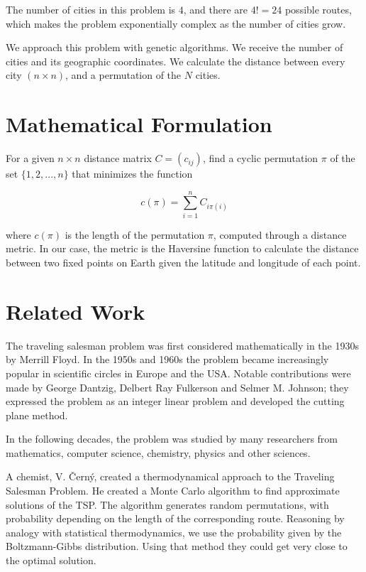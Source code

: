 \documentclass[twoside,twocolumn]{article}
\begin{document}
  The number of cities in this problem is $4$, and there are $4! = 24$ possible routes, which makes the problem exponentially complex as the number of cities grow.\linebreak
  
  We approach this problem with genetic algorithms. We receive the number of cities and its geographic coordinates. We calculate the distance between every city $(n \times n)$, and a permutation of the $N$ cities.\linebreak
  
  
  \section{Mathematical Formulation}
  
  For a given $n \times n$ distance matrix $C = (c_{ij})$, find a cyclic permutation $\pi$ of the set $\{1, 2, ..., n\}$ that minimizes the function
  
  \begin{equation}
  c(\pi) = \sum_{i=1}^{n} C_{i\pi(i)}
  \end{equation}
  
  where $c(\pi)$ is the length of the permutation $\pi$, computed through a distance metric. In our case, the metric is the Haversine function to calculate the distance between two fixed points on Earth given the latitude and longitude of each point.
  
  \section{Related Work}
  
  The traveling salesman problem was first considered mathematically in the 1930s by Merrill Floyd. In the 1950s and 1960s the problem became increasingly popular in scientific circles in Europe and the USA. Notable contributions were made by George Dantzig, Delbert Ray Fulkerson and Selmer M. Johnson; they expressed the problem as an integer linear problem and developed the cutting plane method.\linebreak
  
  In the following decades, the problem was studied by many researchers from mathematics, computer science, chemistry, physics and other sciences.\linebreak
  
  A chemist, V. Černý, created a thermodynamical approach to the Traveling Salesman Problem. He created a Monte Carlo algorithm to find approximate solutions of the TSP. The algorithm generates random permutations, with probability depending on the length of the corresponding route. Reasoning by analogy with statistical thermodynamics, we use the probability given by the Boltzmann-Gibbs distribution. Using that method they could get very close to the optimal solution.\linebreak
  
\end{document}
